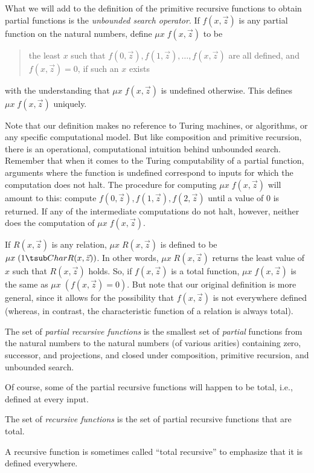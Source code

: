 \documentclass[../../include/open-logic-section]{subfiles}
\begin{document}
What we will add to the definition of the primitive recursive
functions to obtain partial functions is the \emph{unbounded search
  operator}. If $f(x,\vec z)$ is any partial function on the natural
numbers, define $\mu x \; f(x,\vec z)$ to be
\begin{quote}
  the least $x$ such that $f(0,\vec z), f(1,\vec z), \dots, f(x,\vec
  z)$ are all defined, and $f(x,\vec z) = 0$, if such an $x$ exists
\end{quote} 
with the understanding that $\mu x \; f(x,\vec z)$ is undefined
otherwise. This defines $\mu x \; f(x,\vec z)$ uniquely.

\begin{explain}
Note that our definition makes no reference to Turing machines, or
algorithms, or any specific computational model. But like composition
and primitive recursion, there is an operational, computational
intuition behind unbounded search. Remember that when it comes to the
Turing computability of a partial function, arguments where the
function is undefined correspond to inputs for which the computation
does not halt. The procedure for computing $\mu x \; f(x,\vec z)$
will amount to this: compute $f(0,\vec z), f(1,\vec z), f(2,\vec z)$
until a value of 0 is returned. If any of the intermediate
computations do not halt, however, neither does the computation of
$\mu x \; f(x,\vec z)$.
\end{explain}

If $R(x,\vec z)$ is any relation, $\mu x \; R(x,\vec z)$ is defined to
be $\mu x \; (1 \tsub Char{R}(x,\vec z))$. In other words, $\mu x \;
R(x,\vec z)$ returns the least value of $x$ such that $R(x,\vec z)$
holds. So, if $f(x,\vec z)$ is a total function, $\mu x \; f(x,\vec
z)$ is the same as $\mu x \; (f(x,\vec z) = 0)$. But note that our
original definition is more general, since it allows for the
possibility that $f(x,\vec z)$ is not everywhere defined (whereas, in
contrast, the characteristic function of a relation is always total).

\begin{defn}
  The set of \emph{partial recursive functions} is the smallest set of
  \emph{partial} functions from the natural numbers to the natural
  numbers (of various arities) containing zero, successor, and
  projections, and closed under composition, primitive recursion, and
  unbounded search.
\end{defn}

Of course, some of the partial recursive functions will happen to be
total, i.e., defined at every input.

\begin{defn}
  The set of \emph{recursive functions} is the set of partial
  recursive functions that are total.
\end{defn}

A recursive function is sometimes called ``total recursive'' to
emphasize that it is defined everywhere.
\end{document}
